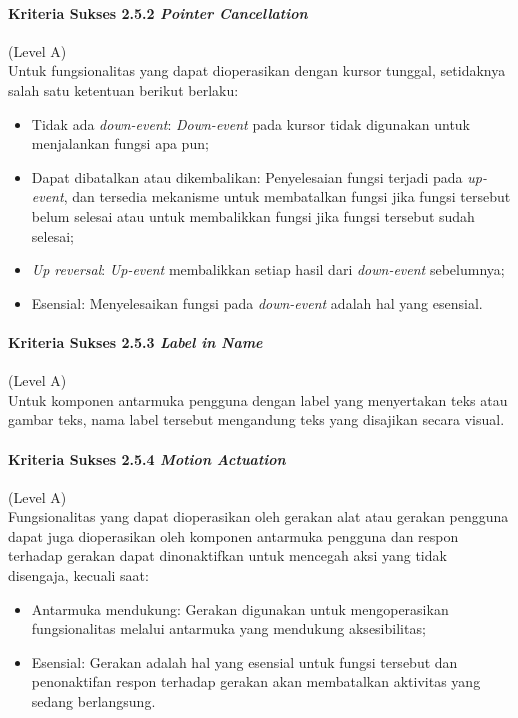 \paragraph{Kriteria Sukses 2.5.2 \textit{Pointer Cancellation}}
\label{sec:kriteria_sukses_2.5.2}
(Level A)\\

Untuk fungsionalitas yang dapat dioperasikan dengan kursor tunggal, setidaknya salah satu ketentuan berikut berlaku:
\begin{itemize}
	\item Tidak ada \textit{down-event}: \textit{Down-event} pada kursor tidak digunakan untuk menjalankan fungsi apa pun;
	\item Dapat dibatalkan atau dikembalikan: Penyelesaian fungsi terjadi pada \textit{up-event}, dan tersedia mekanisme untuk membatalkan fungsi jika fungsi tersebut belum selesai atau untuk membalikkan fungsi jika fungsi tersebut sudah selesai;
	\item \textit{Up reversal}: \textit{Up-event} membalikkan setiap hasil dari \textit{down-event} sebelumnya;
	\item Esensial: Menyelesaikan fungsi pada \textit{down-event} adalah hal yang esensial.
\end{itemize}

\paragraph{Kriteria Sukses 2.5.3 \textit{Label in Name}}
\label{sec:kriteria_sukses_2.5.3}
(Level A)\\

Untuk komponen antarmuka pengguna dengan label yang menyertakan teks atau gambar teks, nama label tersebut mengandung teks yang disajikan secara visual. 

\paragraph{Kriteria Sukses 2.5.4 \textit{Motion Actuation}}
\label{sec:kriteria_sukses_2.5.4}
(Level A)\\

Fungsionalitas yang dapat dioperasikan oleh gerakan alat atau gerakan pengguna dapat juga dioperasikan oleh komponen antarmuka pengguna dan respon terhadap gerakan dapat dinonaktifkan untuk mencegah aksi yang tidak disengaja, kecuali saat:
\begin{itemize}
	\item Antarmuka mendukung: Gerakan digunakan untuk mengoperasikan fungsionalitas melalui antarmuka yang mendukung aksesibilitas;
	\item Esensial: Gerakan adalah hal yang esensial untuk fungsi tersebut dan penonaktifan respon terhadap gerakan akan membatalkan aktivitas yang sedang berlangsung.
\end{itemize}

